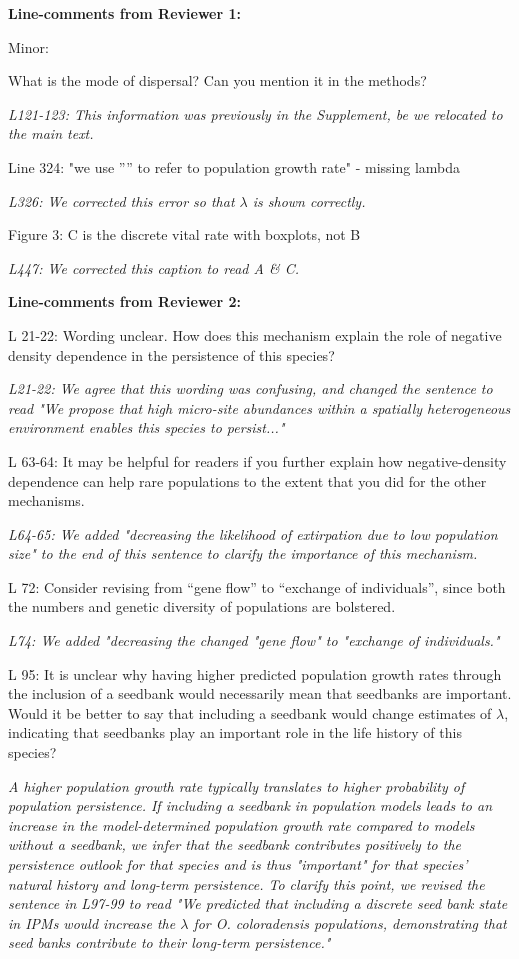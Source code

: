 \documentclass[12pt, letterpaper]{article}
\begin{document}
\begin{flushleft}
\textbf{Line-comments from Reviewer 1: }

Minor:

What is the mode of dispersal? Can you mention it in the methods?

\textit{L121-123: This information was previously in the Supplement, be we relocated to the main text. }

Line 324: "we use ”” to refer to population growth rate" - missing lambda

\textit{L326: We corrected this error so that $\lambda$ is shown correctly.}

Figure 3: C is the discrete vital rate with boxplots, not B

\textit{L447: We corrected this caption to read A \& C.}

\textbf{Line-comments from Reviewer 2: }

L 21-22: Wording unclear. How does this mechanism explain the role of negative density dependence in the persistence of this species?

\textit{L21-22: We agree that this wording was confusing, and changed the sentence to read "We propose that high micro-site abundances within a spatially heterogeneous environment enables this species to persist..."}

L 63-64: It may be helpful for readers if you further explain how negative-density dependence can help rare populations to the extent that you did for the other mechanisms.

\textit{L64-65: We added "decreasing the likelihood of extirpation due to low population size" to the end of this sentence to clarify the importance of this mechanism.}

L 72: Consider revising from “gene flow” to “exchange of individuals”, since both the numbers and genetic diversity of populations are bolstered.

\textit{L74: We added "decreasing the changed "gene flow" to "exchange of individuals."}

L 95: It is unclear why having higher predicted population growth rates through the inclusion of a seedbank would necessarily mean that seedbanks are important. Would it be better to say that including a seedbank would change estimates of $\lambda$, indicating that seedbanks play an important role in the life history of this species?

\textit{A higher population growth rate typically translates to higher probability of population persistence. If including a seedbank in population models leads to an increase in the model-determined population growth rate compared to models without a seedbank, we infer that the seedbank contributes positively to the persistence outlook for that species and is thus "important" for that species' natural history and long-term persistence. To clarify this point, we revised the sentence in L97-99 to read "We predicted that including a discrete seed bank state in IPMs would increase the $\lambda$ for \textit{O. coloradensis} populations, demonstrating that seed banks contribute to their long-term persistence."  }


\end{flushleft}
\end{document}
